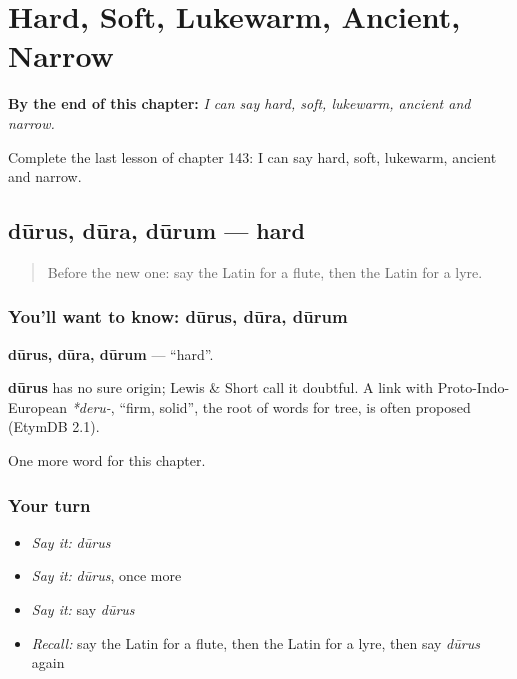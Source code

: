 
\chapter{Hard, Soft, Lukewarm, Ancient, Narrow}
\label{ch:la-hard-soft-lukewarm-ancient-narrow}

\begin{chapteropening}
\textbf{By the end of this chapter:} \emph{I can say hard, soft, lukewarm, ancient and narrow.}

Complete the last lesson of chapter 143: I can say hard, soft, lukewarm, ancient and narrow.
\end{chapteropening}

\section[dūrus, dūra, dūrum]{dūrus, dūra, dūrum — hard}

\label{lesson:LA-C143-durus}



\begin{quote}
Before the new one: say the Latin for a flute, then the Latin for a lyre.
\end{quote}

\subsection*{You'll want to know: dūrus, dūra, dūrum}
\textbf{dūrus, dūra, dūrum} — \textquotedblleft{}hard\textquotedblright{}.

\begin{cousinweb}
\textbf{dūrus} has no sure origin; Lewis \& Short call it doubtful. A link with Proto-Indo-European \emph{*deru-}, \textquotedblleft{}firm, solid\textquotedblright{}, the root of words for tree, is often proposed (EtymDB 2.1).
\end{cousinweb}

\begin{grammarlens}[title={What you've built}]
One more word for this chapter.
\end{grammarlens}

\subsection*{Your turn}
\begin{itemize}
\raggedright
  \item \emph{Say it:} \emph{dūrus}
  \item \emph{Say it:} \emph{dūrus}, once more
  \item \emph{Say it:} say \emph{dūrus}
  \item \emph{Recall:} say the Latin for a flute, then the Latin for a lyre, then say \emph{dūrus} again
\end{itemize}

